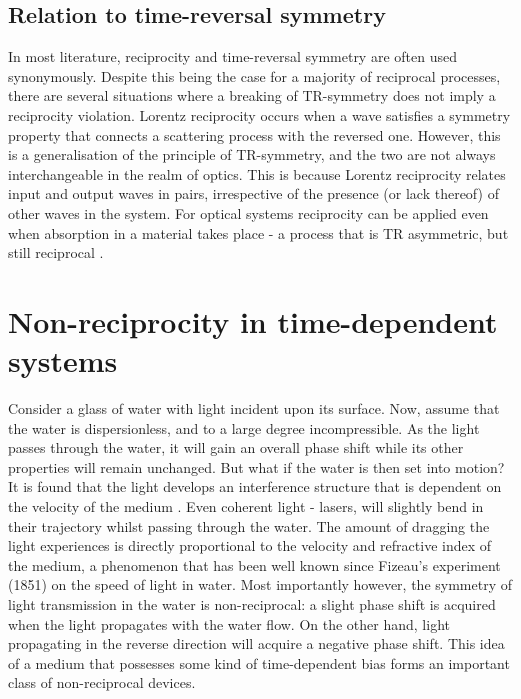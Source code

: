\subsection{Relation to time-reversal symmetry}
In most literature, reciprocity and time-reversal symmetry are often used synonymously. Despite this being the case for a majority of reciprocal processes, there are several situations where a breaking of TR-symmetry does not imply a reciprocity violation. Lorentz reciprocity occurs when a wave satisfies a symmetry property that connects a scattering process with the reversed one. However, this is a generalisation of the principle of TR-symmetry, and the two are not always interchangeable in the realm of optics. This is because Lorentz reciprocity relates input and output waves in pairs, irrespective of the presence (or lack thereof) of other waves in the system. For optical systems reciprocity can be applied even when absorption in a material takes place - a process that is TR asymmetric, but still reciprocal \cite{Potton2004a}.

\section{Non-reciprocity in time-dependent systems}
\label{mome}

Consider a glass of water with light incident upon its surface. Now, assume that the water is dispersionless, and to a large degree incompressible. As the light passes through the water, it will gain an overall phase shift while its other properties will remain unchanged. But what if the water is then set into motion? It is found that the light develops an interference structure that is dependent on the velocity of the medium \cite{Zalesny2001a}. Even coherent light - lasers, will slightly bend in their trajectory whilst passing through the water. The amount of dragging the light experiences is directly proportional to the velocity and refractive index of the medium, a phenomenon that has been well known since Fizeau's experiment (1851) on the speed of light in water. Most importantly however, the symmetry of light transmission in the water is non-reciprocal: a slight phase shift is acquired when the light propagates with the water flow. On the other hand, light propagating in the reverse direction will acquire a negative phase shift. This idea of a medium that possesses some kind of time-dependent bias forms an important class of non-reciprocal devices. 

